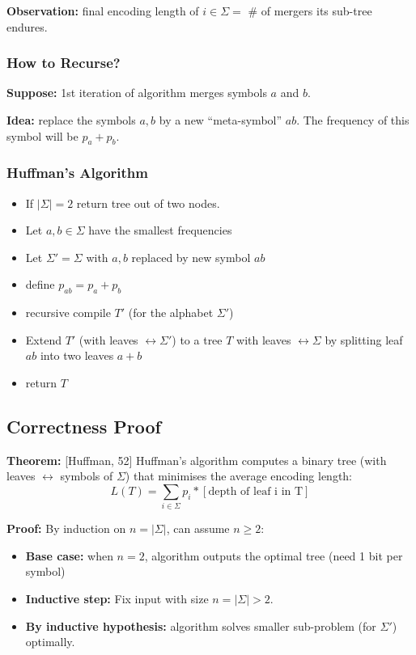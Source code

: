 \documentclass{scrartcl}
\begin{document}
{\bf Observation: } final encoding length of $i \in \Sigma = $ \# of mergers its
sub-tree endures. 

\subsubsection{How to Recurse?}
\label{sec:7-3-2}

{\bf Suppose: } 1st iteration of algorithm merges symbols $a$ and $b$. 

{\bf Idea: } replace the symbols $a,b$ by a new ``meta-symbol'' $ab$. The
frequency of this symbol will be $p_a + p_b$.

\subsubsection{Huffman's Algorithm }
\label{sec:7-3-3}

\begin{itemize}
\item If $|\Sigma| = 2$ return tree out of two nodes.
\item Let $a, b \in \Sigma$ have the smallest frequencies
\item Let $\Sigma' = \Sigma$ with $a, b$ replaced by new symbol $ab$
\item define $p_{ab} = p_a + p_b$
\item recursive compile $T'$ (for the alphabet $\Sigma'$)
\item Extend $T'$ (with leaves $\leftrightarrow \Sigma'$) to a tree $T$ with
  leaves $\leftrightarrow \Sigma$ by splitting leaf $ab$ into two leaves $a + b$
\item return $T$
\end{itemize}

\subsection{Correctness Proof}
\label{sec:7-4}
{\bf Theorem: }[Huffman, 52] Huffman's algorithm computes a binary tree (with
leaves $\leftrightarrow$ symbols of $\Sigma$) that minimises the average
encoding length:
$$ L(T) = \sum_{i \in \Sigma} p_i * [\text{depth of leaf i in T}]$$ 

{\bf Proof: } By induction on $n = |\Sigma|$, can assume $n \geq 2$:
\begin{itemize}
\item {\bf Base case: } when $n = 2$, algorithm outputs the optimal tree (need 1
  bit per symbol)
\item {\bf Inductive step: } Fix input with size $n = |\Sigma| > 2$.
\item {\bf By inductive hypothesis: } algorithm solves smaller sub-problem (for
  $\Sigma '$) optimally.
\end{itemize}
\end{document}
